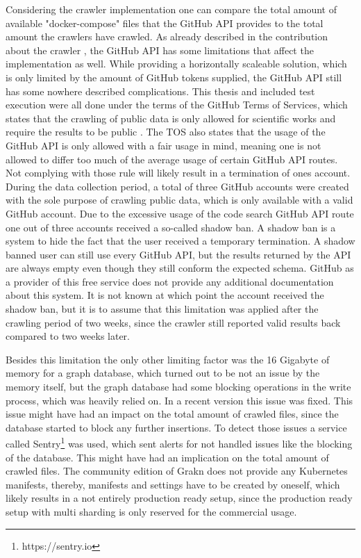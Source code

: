 Considering the crawler implementation one can compare the total amount of available "docker-compose" files that the GitHub API provides to the total amount the crawlers have crawled. As already described in the contribution about the crawler , the GitHub API has some limitations that affect the implementation as well. While providing a horizontally scaleable solution, which is only limited by the amount of GitHub tokens supplied, the GitHub API still has some nowhere described complications. This thesis and included test execution were all done under the terms of the GitHub Terms of Services, which states that the crawling of public data is only allowed for scientific works and require the results to be public . The TOS also states that the usage of the GitHub API is only allowed with a fair usage in mind, meaning one is not allowed to differ too much of the average usage of certain GitHub API routes. Not complying with those rule will likely result in a termination of ones account. During the data collection period, a total of three GitHub accounts were created with the sole purpose of crawling public data, which is only available with a valid GitHub account. Due to the excessive usage of the code search GitHub API route one out of three accounts received a so-called shadow ban. A shadow ban is a system to hide the fact that the user received a temporary termination. A shadow banned user can still use every GitHub API, but the results returned by the API are always empty even though they still conform the expected schema. GitHub as a provider of this free service does not provide any additional documentation about this system. It is not known at which point the account received the shadow ban, but it is to assume that this limitation was applied after the crawling period of two weeks, since the crawler still reported valid results back compared to two weeks later.

Besides this limitation the only other limiting factor was the 16 Gigabyte of memory for a graph database, which turned out to be not an issue by the memory itself, but the graph database had some blocking operations in the write process, which was heavily relied on. In a recent version this issue was fixed. This issue might have had an impact on the total amount of crawled files, since the database started to block any further insertions. To detect those issues a service called Sentry\footnote{https://sentry.io} was used, which sent alerts for not handled issues like the blocking of the database. This might have had an implication on the total amount of crawled files. The community edition of Grakn does not provide any Kubernetes manifests, thereby, manifests and settings have to be created by oneself, which likely results in a not entirely production ready setup, since the production ready setup with multi sharding is only reserved for the commercial usage.

